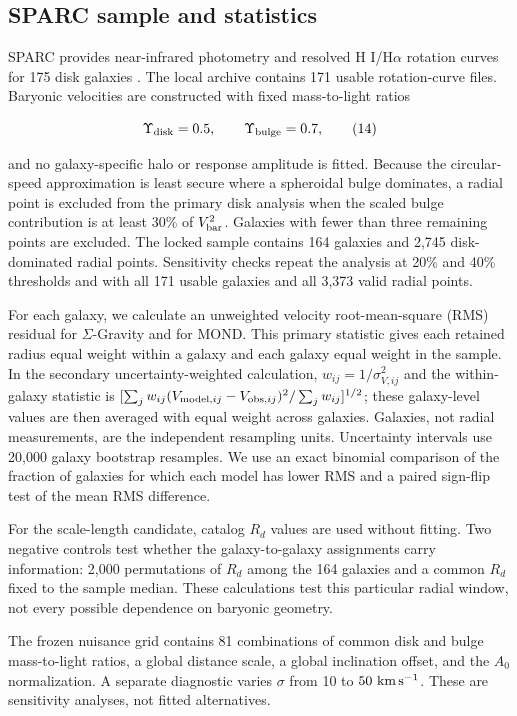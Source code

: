 \documentclass[utf8]{FrontiersinHarvard}
\begin{document}
\subsection{SPARC sample and statistics}\label{sparc-sample-and-statistics}

SPARC provides near-infrared photometry and resolved H I/H\(\alpha\) rotation curves for 175 disk galaxies \citep{lelli2016}. The local archive contains 171 usable rotation-curve files. Baryonic velocities are constructed with fixed mass-to-light ratios

\[
\Upsilon_{\rm disk}=0.5,\qquad
\Upsilon_{\rm bulge}=0.7,
\tag{14}
\]

and no galaxy-specific halo or response amplitude is fitted. Because the circular-speed approximation is least secure where a spheroidal bulge dominates, a radial point is excluded from the primary disk analysis when the scaled bulge contribution is at least 30\% of \(V_{\rm bar}^2\). Galaxies with fewer than three remaining points are excluded. The locked sample contains 164 galaxies and 2,745 disk-dominated radial points. Sensitivity checks repeat the analysis at 20\% and 40\% thresholds and with all 171 usable galaxies and all 3,373 valid radial points.

For each galaxy, we calculate an unweighted velocity root-mean-square (RMS) residual for \(\Sigma\)-Gravity and for MOND. This primary statistic gives each retained radius equal weight within a galaxy and each galaxy equal weight in the sample. In the secondary uncertainty-weighted calculation, \(w_{ij}=1/\sigma_{V,ij}^2\) and the within-galaxy statistic is \([\sum_j w_{ij}(V_{{\rm model},ij}-V_{{\rm obs},ij})^2/\sum_j w_{ij}]^{1/2}\); these galaxy-level values are then averaged with equal weight across galaxies. Galaxies, not radial measurements, are the independent resampling units. Uncertainty intervals use 20,000 galaxy bootstrap resamples. We use an exact binomial comparison of the fraction of galaxies for which each model has lower RMS and a paired sign-flip test of the mean RMS difference.

For the scale-length candidate, catalog \(R_d\) values are used without fitting. Two negative controls test whether the galaxy-to-galaxy assignments carry information: 2,000 permutations of \(R_d\) among the 164 galaxies and a common \(R_d\) fixed to the sample median. These calculations test this particular radial window, not every possible dependence on baryonic geometry.

The frozen nuisance grid contains 81 combinations of common disk and bulge mass-to-light ratios, a global distance scale, a global inclination offset, and the \(A_0\) normalization. A separate diagnostic varies \(\sigma\) from 10 to \(50\ {\rm km\,s^{-1}}\). These are sensitivity analyses, not fitted alternatives.
\end{document}
